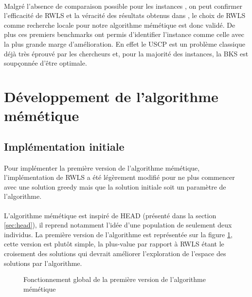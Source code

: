 \documentclass[a4paper,11pt,twoside,french,report]{../common/simplem}
\begin{document}
				\paragraph*{}
					Malgré l'absence de comparaison possible pour les instances , on peut confirmer l'efficacité de \gls{RWLS} et la véracité des résultats obtenus dans \cite{Gao2015}, le choix de \gls{RWLS} comme recherche locale pour notre algorithme mémétique est donc validé. De plus ces premiers benchmarks ont permis d'identifier l'instance  comme celle avec la plus grande marge d'amélioration. En effet le \gls{USCP} est un problème classique déjà très éprouvé par les chercheurs et, pour la majorité des instances, la \gls{BKS} est soupçonnée d'être optimale.
		\section{Développement de l'algorithme mémétique}\label{sec:memetic_algorithm}
			\subsection{Implémentation initiale}
				\paragraph*{}
					Pour implémenter la première version de l'algorithme mémétique, l'implémentation de \gls{RWLS} a été légèrement modifié pour ne plus commencer avec une solution greedy mais que la solution initiale soit un paramètre de l'algorithme.
				\paragraph*{}
					L'algorithme mémétique est inspiré de \gls{HEAD} (présenté dans la section \ref{sec:head}), il reprend notamment l'idée d'une population de seulement deux individus. La première version de l'algorithme est représentée sur la figure \ref{fig:memetic_algorithm_v1}, cette version est plutôt simple, la plus-value par rapport à \gls{RWLS} étant le croisement des solutions qui devrait améliorer l'exploration de l'espace des solutions par l'algorithme.
				\begin{figure}[H]
					\centering%
					\caption{Fonctionnement global de la première version de l'algorithme mémétique}%
					\label{fig:memetic_algorithm_v1}%
				\end{figure}
\end{document}
